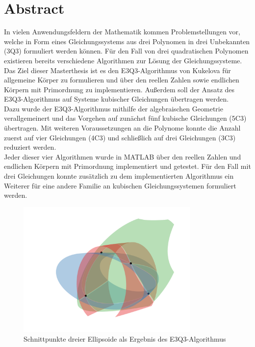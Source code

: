 \documentclass[a4paper,oneside, 11pt, openany%
]{article}
\theoremstyle{custom}
\theoremstyle{custom}
\begin{document}
	\section*{Abstract}
	In vielen Anwendungsfeldern der Mathematik kommen Problemstellungen vor, welche in Form eines Gleichungssystems aus drei Polynomen in drei Unbekannten (3Q3) formuliert werden können. Für den Fall von drei quadratischen Polynomen existieren bereits verschiedene Algorithmen zur Lösung der Gleichungssysteme.\\
	Das Ziel dieser Masterthesis ist es den E3Q3-Algorithmus von Kukelova für allgemeine Körper zu formulieren und über den reellen Zahlen sowie endlichen Körpern mit Primordnung zu implementieren. Außerdem soll der Ansatz des E3Q3-Algorithmus auf Systeme kubischer Gleichungen übertragen werden.\\
	Dazu wurde der E3Q3-Algorithmus mithilfe der algebraischen Geometrie verallgemeinert und das Vorgehen auf zunächst fünf kubische Gleichungen (5C3) übertragen. Mit weiteren Voraussetzungen an die Polynome konnte die Anzahl zuerst auf vier Gleichungen (4C3) und schließlich auf drei Gleichungen (3C3) reduziert werden.\\
	Jeder dieser vier Algorithmen wurde in MATLAB über den reellen Zahlen und endlichen Körpern mit Primordnung implementiert und getestet. Für den Fall mit drei Gleichungen konnte zusätzlich zu dem implementierten Algorithmus ein Weiterer für eine andere Familie an kubischen Gleichungssystemen formuliert werden.
	\begin{figure}[H]
		\includegraphics[width=0.8\textwidth]{"images/e3q3_example1_zoom.png"}
		\caption*{Schnittpunkte dreier Ellipsoide als Ergebnis des E3Q3-Algorithmus}
	\end{figure}
	\newpage
	\setcounter{tocdepth}{3}
	\tableofcontents
	\newpage
	\setcounter{tocdepth}{2}
	\listoffigures
	\newpage
\end{document}
